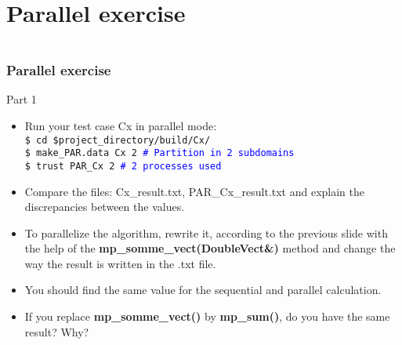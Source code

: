 \documentclass[10pt, hyperref={unicode=true,pdfusetitle, bookmarks=true,bookmarksnumbered=false,bookmarksopen=false, breaklinks=false,pdfborder={0 0 1},backref=true,colorlinks=true,linkcolor=darkblue,pageanchor, urlcolor=darkblue}]{beamer}
\begin{document}
\section{{\bf{Parallel exercise}}}
\begin{frame}
\begin{columns}[c] 
\tableofcontents[sections={1-3},currentsection, currentsubsection]
\tableofcontents[sections={4-8},currentsection, currentsubsection]
\end{columns}
\end{frame}
\begin{frame}
\frametitle{Parallel exercise}

\begin{block}{Part 1}
\begin{itemize}
\item Run your test case Cx in parallel mode:\\
    \texttt{\$ cd \$project\_directory/build/Cx/}\\
\texttt{\$ make\_PAR.data Cx 2 \textcolor{blue}{\# Partition in 2 subdomains}}\\
\texttt{\$ trust PAR\_Cx 2 \textcolor{blue}{\# 2 processes used}}
\item Compare the files: Cx\_result.txt, PAR\_Cx\_result.txt and explain the discrepancies between the values.
\item To parallelize the algorithm, rewrite it, according to the previous slide with the help of 
the \textbf{mp\_somme\_vect(DoubleVect\&)} method and change the way the result is written in the .txt file. 
\item You should find the same value for the sequential and parallel calculation.
\item If you replace \textbf{mp\_somme\_vect()} by \textbf{mp\_sum()}, do you have the same result? Why?
\end{itemize}

\end{block}
\end{frame}
\end{document}

